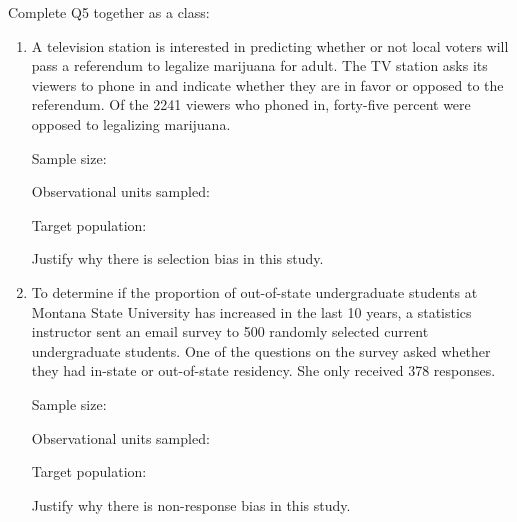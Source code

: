 \documentclass[
]{report}
\begin{document}
Complete Q5 together as a class:

\begin{enumerate}
\def\labelenumi{\arabic{enumi}.}
\setcounter{enumi}{4}
\item
  A television station is interested in predicting whether or not local voters will pass a referendum to legalize marijuana for adult. The TV station asks its viewers to phone in and indicate whether they are in favor or opposed to the referendum. Of the 2241 viewers who phoned in, forty-five percent were opposed to legalizing marijuana.
  \vspace{0.1in}

  Sample size:
  \vspace{0.3in}

  Observational units sampled:
  \vspace{0.3in}

  Target population:
  \vspace{0.3in}

  Justify why there is selection bias in this study.
  \vspace{0.5in}
\item
  To determine if the proportion of out-of-state undergraduate students at Montana State University has increased in the last 10 years, a statistics instructor sent an email survey to 500 randomly selected current undergraduate students. One of the questions on the survey asked whether they had in-state or out-of-state residency. She only received 378 responses.
  \vspace{0.1in}

  Sample size:
  \vspace{0.3in}

  Observational units sampled:
  \vspace{0.3in}

  Target population:
  \vspace{0.3in}

  Justify why there is non-response bias in this study.
  \vspace{0.5in}
\end{enumerate}

\newpage
\end{document}

